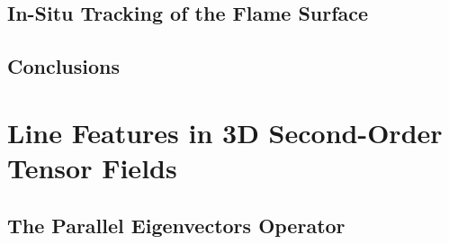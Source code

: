 \documentclass[BCOR=15mm, DIV=8]{scrbook}
\begin{document}
\chapter{In-Situ Tracking of the Flame Surface} %
\label{cha:flame_surface_tracking}
%
%






%

\chapter{Conclusions} %
\label{cha:flame_vis_conclusions}



\part{Line Features in 3D Second-Order Tensor Fields} %
\label{part:tensor_vis}

\chapter{The Parallel Eigenvectors Operator} %
\label{cha:parallel_eigenvectors}
%
%







%
\end{document}
